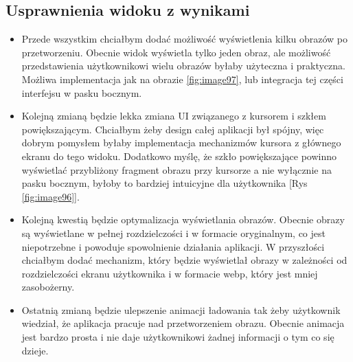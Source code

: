\subsection*{Usprawnienia widoku z wynikami}

\begin{itemize}
    \item Przede wszystkim chciałbym dodać możliwość wyświetlenia kilku obrazów po przetworzeniu. Obecnie widok wyświetla tylko jeden obraz, ale możliwość przedstawienia użytkownikowi wielu obrazów byłaby użyteczna i praktyczna. Możliwa implementacja jak na obrazie \ref{fig:image97}, lub integracja tej części interfejsu w pasku bocznym.
    \item Kolejną zmianą będzie lekka zmiana UI związanego z kursorem i szkłem powiększającym. Chciałbym żeby design całej aplikacji był spójny, więc dobrym pomysłem byłaby implementacja mechanizmów kursora z głównego ekranu do tego widoku. Dodatkowo myślę, że szkło powiększające powinno wyświetlać przybliżony fragment obrazu przy kursorze a nie wyłącznie na pasku bocznym, byłoby to bardziej intuicyjne dla użytkownika [Rys \ref{fig:image96}].
    \item Kolejną kwestią będzie optymalizacja wyświetlania obrazów. Obecnie obrazy są wyświetlane w pełnej rozdzielczości i w formacie oryginalnym, co jest niepotrzebne i powoduje spowolnienie działania aplikacji. W przyszłości chciałbym dodać mechanizm, który będzie wyświetlał obrazy w zależności od rozdzielczości ekranu użytkownika i w formacie webp, który jest mniej zasobożerny.
    \item Ostatnią zmianą będzie ulepszenie animacji ładowania tak żeby użytkownik wiedział, że aplikacja pracuje nad przetworzeniem obrazu. Obecnie animacja jest bardzo prosta i nie daje użytkownikowi żadnej informacji o tym co się dzieje.
\end{itemize}

